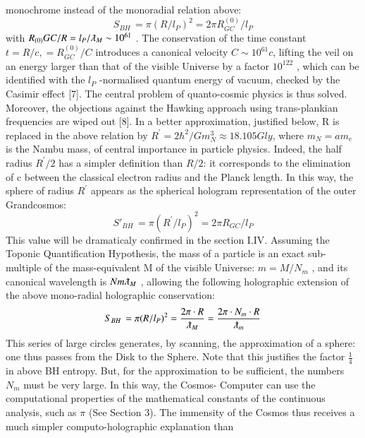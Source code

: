 \documentclass[twoside,draft]{article}
\begin{document}
\begin{sloppypar}
{monochrome instead of the monoradial relation above:
\begin{equation}
S_{BH}\, = \pi(R/l_P )^{2} = 2\pi R^{(0)}_{GC} /l_{P}
\end{equation}
with $R_{(0)} GC /R = l_{P} /\lambdabar_{M} \sim 10^{61}$ . The conservation of the time constant $t = R/c, = R^{(0)}_{GC} /C$ introduces a canonical velocity $C \sim 10^{61} c$, lifting the veil on an energy larger than that of the visible Universe by a
factor $10^{122}$ , which can be identified with the $l_{P}$ -normalised quantum energy of vacuum, checked by
the Casimir effect [7]. The central problem of quanto-cosmic physics is thus solved. Moreover, the
objections against the Hawking approach using trans-plankian frequencies are wiped out [8].
In a better approximation, justified below, R is replaced in the above relation by $R^{\prime} = 2\hbar^{2}/Gm_{N}^{3}
\approx 18.105 Gly$, where $m_{N} = am_{e}$ is the Nambu mass, of central importance in particle
physics. Indeed, the half radius $R^{\prime}/2$ has a simpler definition than $R/2$: it corresponds to the
elimination of c between the classical electron radius and the Planck length. In this way, the sphere
of radius $R^{\prime}$ appears as the spherical hologram representation of the outer Grandcosmos:
\begin{equation}
S\prime_{BH}\, = \pi(R^{\prime}/l_{P})^{2} = 2\pi R_{GC} /l_{P}
\end{equation}
This value will be dramaticaly confirmed in the section I.IV.
Assuming the Toponic Quantification Hypothesis, the mass of a particle is an exact sub-multiple
of the mass-equivalent M of the visible Universe: $m = M/N_{m}$ , and its canonical wavelength is $N m \lambdabar_{M}$ ,
allowing the following holographic extension of the above mono-radial holographic conservation:
\begin{equation}
S_{BH}\, = \pi(R/l_{P})^{2} = \frac{2\pi \cdot R}{\lambdabar_{M}} = \frac{2\pi \cdot N_{m} \cdot R}{\lambdabar_{m}}
\end{equation}
This series of large circles generates, by scanning, the approximation of a sphere: one thus passes
from the Disk to the Sphere. Note that this justifies the factor $\frac{1}{4}$ in above BH entropy. But, for
the approximation to be sufficient, the numbers $N_{m}$ must be very large. In this way, the Cosmos-
Computer can use the computational properties of the mathematical constants of the continuous
analysis, such as $\pi$ (See Section 3).
The immensity of the Cosmos thus receives a much simpler computo-holographic explanation than
}
\end{sloppypar}
\end{document}
